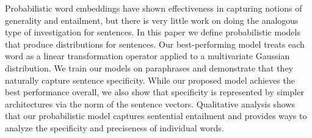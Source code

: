Probabilistic word embeddings have shown effectiveness in capturing notions of generality and entailment, but there is very little work on doing the analogous type of investigation for sentences. In this paper we define probabilistic models that produce distributions for sentences. Our best-performing model treats each word as a linear transformation operator applied to a multivariate Gaussian distribution. We train our models on paraphrases and demonstrate that they naturally capture sentence specificity. While our proposed model achieves the best performance overall, we also show that specificity is represented by simpler architectures via the norm of the sentence vectors. Qualitative analysis shows that our probabilistic model captures sentential entailment and provides ways to analyze the specificity and preciseness of individual words.
